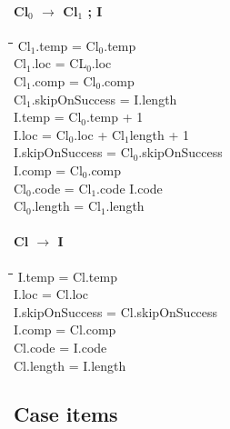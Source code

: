 \paragraph{Cl$_{0}$ $\rightarrow$ Cl$_{1}$ ; I}
\begin{tabbing}
	\hspace*{0.5cm}\=\hspace*{3.3cm}\=\hspace*{0.5cm}\=\hspace*{10cm}\= \kill
	\>Cl$_{1}$.temp 					\>= \>Cl$_{0}$.temp \\
	\>Cl$_{1}$.loc 						\>= \>CL$_{0}$.loc \\
	\>Cl$_{1}$.comp 					\>= \>Cl$_{0}$.comp \\
	\>Cl$_{1}$.skipOnSuccess	\>= \>I.length \\
	\>I.temp 									\>= \>Cl$_{0}$.temp + 1 \\
	\>I.loc 									\>= \>Cl$_{0}$.loc + Cl$_{1}$length + 1 \\
	\>I.skipOnSuccess 				\>= \>Cl$_{0}$.skipOnSuccess \\
	\>I.comp									\>=	\>Cl$_{0}$.comp \\
	\>Cl$_{0}$.code 					\>= \>Cl$_{1}$.code I.code \\
	\>Cl$_{0}$.length 				\>= \>Cl$_{1}$.length
\end{tabbing}

\paragraph{Cl $\rightarrow$ I}
\begin{tabbing}
	\hspace*{0.5cm}\=\hspace*{3.3cm}\=\hspace*{0.5cm}\=\hspace*{10cm}\= \kill
	\>I.temp					\>=	\>Cl.temp \\
	\>I.loc 					\>= \>Cl.loc \\
	\>I.skipOnSuccess \>= \>Cl.skipOnSuccess \\
	\>I.comp					\>=	\>Cl.comp \\
	\>Cl.code 				\>= \>I.code\\
	\>Cl.length 			\>= \>I.length
\end{tabbing}

\subsection{Case items}

